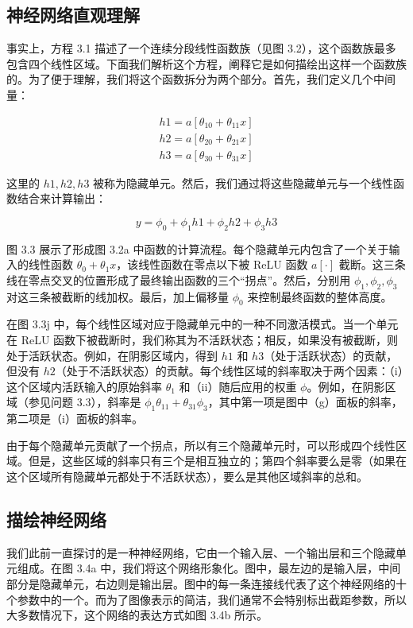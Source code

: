 \subsection{神经网络直观理解}
事实上，方程 3.1 描述了一个连续分段线性函数族（见图 3.2），这个函数族最多包含四个线性区域。下面我们解析这个方程，阐释它是如何描绘出这样一个函数族的。为了便于理解，我们将这个函数拆分为两个部分。首先，我们定义几个中间量：


\begin{align}
h1 = a[\theta_{10} + \theta_{11}x] \\
h2 = a[\theta_{20} + \theta_{21}x] \\
h3 = a[\theta_{30} + \theta_{31}x] 
\end{align} 

这里的 \(h1, h2, h3\) 被称为隐藏单元。然后，我们通过将这些隐藏单元与一个线性函数结合来计算输出：

\[
y = \phi_0 + \phi_1h1 + \phi_2h2 + \phi_3h3 \tag{3.4}
\]

图 3.3 展示了形成图 3.2a 中函数的计算流程。每个隐藏单元内包含了一个关于输入的线性函数 \(\theta_0 + \theta_1x\)，该线性函数在零点以下被 ReLU 函数 \(a[\cdot]\) 截断。这三条线在零点交叉的位置形成了最终输出函数的三个“拐点”。然后，分别用 \(\phi_1, \phi_2, \phi_3\) 对这三条被截断的线加权。最后，加上偏移量 \(\phi_0\) 来控制最终函数的整体高度。


在图 3.3j 中，每个线性区域对应于隐藏单元中的一种不同激活模式。当一个单元在 ReLU 函数下被截断时，我们称其为不活跃状态；相反，如果没有被截断，则处于活跃状态。例如，在阴影区域内，得到 \(h1\) 和 \(h3\)（处于活跃状态）的贡献，但没有 \(h2\)（处于不活跃状态）的贡献。每个线性区域的斜率取决于两个因素：（i）这个区域内活跃输入的原始斜率 \(\theta_1\) 和（ii）随后应用的权重 \(\phi\)。例如，在阴影区域（参见问题 3.3），斜率是 \(\phi_1\theta_{11} + \theta_{31}\phi_3\)，其中第一项是图中（g）面板的斜率，第二项是（i）面板的斜率。

由于每个隐藏单元贡献了一个拐点，所以有三个隐藏单元时，可以形成四个线性区域。但是，这些区域的斜率只有三个是相互独立的；第四个斜率要么是零（如果在这个区域所有隐藏单元都处于不活跃状态），要么是其他区域斜率的总和。
\subsection{描绘神经网络}
我们此前一直探讨的是一种神经网络，它由一个输入层、一个输出层和三个隐藏单元组成。在图 3.4a 中，我们将这个网络形象化。图中，最左边的是输入层，中间部分是隐藏单元，右边则是输出层。图中的每一条连接线代表了这个神经网络的十个参数中的一个。而为了图像表示的简洁，我们通常不会特别标出截距参数，所以大多数情况下，这个网络的表达方式如图 3.4b 所示。


